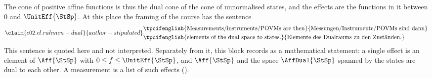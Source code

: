 \begin{vertiefung}
  The cone of positive affine functions is thus the dual cone of the cone of unnormalised
  states, and the effects are the functions in it between $0$ and $\UnitEff{\StSp}$. At
  this place the framing of the course has the sentence
  \begin{equation}\label{c02.eq.rahmen-dual}\claim{c02.cl.rahmen-dual}{author-stipulated}
    \begin{aligned}
      &\text{\tpcifenglish{Measurements/instruments/POVMs are then}{Messungen/Instrumente/POVMs sind dann}} \\
      &\text{\tpcifenglish{elements of the dual space to states.}{Elemente des Dualraums zu den Zuständen.}}
    \end{aligned}
  \end{equation}
  This sentence is quoted here and not interpreted. Separately from it, this block records
  as a mathematical statement: a single effect is an element of $\Aff{\StSp}$ with
  $0 \leq f \leq \UnitEff{\StSp}$, and $\Aff{\StSp}$ and the space $\AffDual{\StSp}$
  spanned by the states are dual to each other. A measurement is a list of such effects
  ().


\end{vertiefung}
